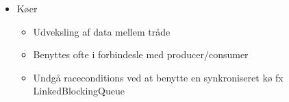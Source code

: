 \begin{itemize}
\begin{itemize}
        \item Køer
        \begin{itemize}
            \item Udveksling af data mellem tråde
            \item Benyttes ofte i forbindesle med producer/consumer
            \item Undgå raceconditions ved at benytte en synkroniseret kø fx LinkedBlockingQueue
        \end{itemize}
    \end{itemize}
\end{itemize}

